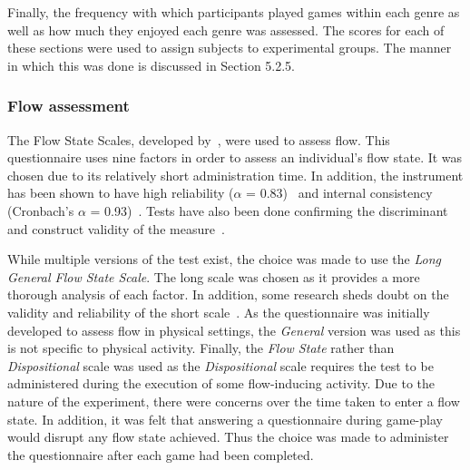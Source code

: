 Finally, the frequency with which participants played games within each genre as well as how much they enjoyed each genre was assessed. The scores for each of these sections were used to assign subjects to experimental groups. The manner in which this was done is discussed in Section 5.2.5.

\subsubsection{Flow assessment}
The Flow State Scales, developed by~\citet{Jack01}, were used to assess flow. This questionnaire uses nine factors in order to assess an individual's flow state. It was chosen due to its relatively short administration time. In addition, the instrument has been shown to have high reliability ($\alpha$ = 0.83)~\citep{Jack01} and internal consistency (Cronbach's $\alpha$ = 0.93)~\citep{Tene99}. Tests have also been done confirming the discriminant and construct validity of the measure~\citep{Mars99}.

While multiple versions of the test exist, the choice was made to use the \emph{Long General Flow State Scale}. The long scale was chosen as it provides a more thorough analysis of each factor. In addition, some research sheds doubt on the validity and reliability of the short scale~\citep{Tene99}. As the questionnaire was initially developed to assess flow in physical settings, the \emph{General} version was used as this is not specific to physical activity. Finally, the \emph{Flow State} rather than \emph{Dispositional} scale was used as the \emph{Dispositional} scale requires the test to be administered during the execution of some flow-inducing activity. Due to the nature of the experiment, there were concerns over the time taken to enter a flow state. In addition, it was felt that answering a questionnaire during game-play would disrupt any flow state achieved. Thus the choice was made to administer the questionnaire after each game had been completed.

